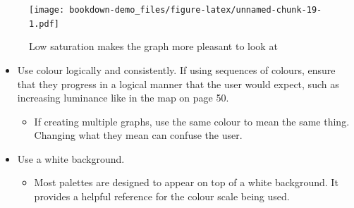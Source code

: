 \documentclass[
]{book}
\newenvironment{Shaded}{\begin{snugshade}}{\end{snugshade}}
\newcommand{\CharTok}[1]{\textcolor[rgb]{0.31,0.60,0.02}{#1}}
\newcommand{\DataTypeTok}[1]{\textcolor[rgb]{0.13,0.29,0.53}{#1}}
\newcommand{\FloatTok}[1]{\textcolor[rgb]{0.00,0.00,0.81}{#1}}
\newcommand{\KeywordTok}[1]{\textcolor[rgb]{0.13,0.29,0.53}{\textbf{#1}}}
\newcommand{\NormalTok}[1]{#1}
\newcommand{\OperatorTok}[1]{\textcolor[rgb]{0.81,0.36,0.00}{\textbf{#1}}}
\newcommand{\StringTok}[1]{\textcolor[rgb]{0.31,0.60,0.02}{#1}}
\providecommand{\tightlist}{%
  \setlength{\itemsep}{0pt}\setlength{\parskip}{0pt}}
\begin{document}
\begin{Shaded}
\end{Shaded}

\begin{figure}
\centering
\texttt{[image: bookdown-demo\_files/figure-latex/unnamed-chunk-19-1.pdf]}
\caption{\label{fig:unnamed-chunk-19}Low saturation makes the graph more pleasant to look at}
\end{figure}

\begin{itemize}
\item
  Use colour logically and consistently. If using sequences of colours, ensure that they progress in a logical manner that the user would expect, such as increasing luminance like in the map on page 50.

  \begin{itemize}
  \tightlist
  \item
    If creating multiple graphs, use the same colour to mean the same thing. Changing what they mean can confuse the user.
  \end{itemize}
\item
  Use a white background.

  \begin{itemize}
  \tightlist
  \item
    Most palettes are designed to appear on top of a white background. It provides a helpful reference for the colour scale being used.
  \end{itemize}
\end{itemize}
\end{document}
